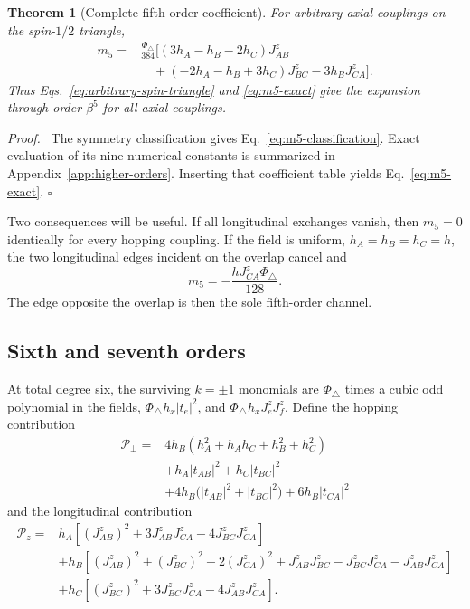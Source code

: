 \documentclass[11pt]{article}
\newcommand{\PhiTri}{\Phi_\triangle}
\newtheorem{theorem}{Theorem}
\newenvironment{proof}{\par\noindent\textit{Proof.}\ }%
{\unskip\nobreak\hfill\(\square\)\par}
\begin{document}
\begin{theorem}[Complete fifth-order coefficient]
\label{thm:quintic}
For arbitrary axial couplings on the spin-$1/2$ triangle,
\begin{align}
 m_5={}&\frac{\PhiTri}{384}\bigl[
 (3h_A-h_B-2h_C)J_{AB}^z\nonumber\\
 &\quad+(-2h_A-h_B+3h_C)J_{BC}^z
 -3h_BJ_{CA}^z\bigr].
 \label{eq:m5-exact}
\end{align}
Thus Eqs.~\eqref{eq:arbitrary-spin-triangle} and \eqref{eq:m5-exact} give the expansion
through order $\beta^5$ for all axial couplings.
\end{theorem}

\begin{proof}
The symmetry classification gives Eq.~\eqref{eq:m5-classification}.  Exact
evaluation of its nine numerical constants is summarized in
Appendix~\ref{app:higher-orders}.  Inserting that coefficient table yields
Eq.~\eqref{eq:m5-exact}.
\end{proof}

Two consequences will be useful.  If all longitudinal exchanges vanish,
then $m_5=0$ identically for every hopping coupling.  If the field is
uniform, $h_A=h_B=h_C=h$, the two longitudinal edges incident on the overlap
cancel and
\begin{equation}
 m_5=-\frac{hJ_{CA}^z\PhiTri}{128}.
 \label{eq:m5-uniform}
\end{equation}
The edge opposite the overlap is then the sole fifth-order channel.

\subsection{Sixth and seventh orders}

At total degree six, the surviving $k=\pm1$ monomials are $\PhiTri$ times a
cubic odd polynomial in the fields, $\PhiTri h_x|t_e|^2$, and
$\PhiTri h_xJ_e^zJ_f^z$.  Define the hopping contribution
\begin{align}
 \mathcal P_\perp={}&
 4h_B(h_A^2+h_Ah_C+h_B^2+h_C^2)\nonumber\\
 &+h_A|t_{AB}|^2+h_C|t_{BC}|^2\nonumber\\
 &+4h_B\bigl(|t_{AB}|^2+|t_{BC}|^2\bigr)
 +6h_B|t_{CA}|^2
 \label{eq:Pperp}
\end{align}
and the longitudinal contribution
\begin{align}
 \mathcal P_z={}&
 h_A\left[(J_{AB}^z)^2+3J_{AB}^zJ_{CA}^z
              -4J_{BC}^zJ_{CA}^z\right]\nonumber\\
 &+h_B\left[(J_{AB}^z)^2+(J_{BC}^z)^2+2(J_{CA}^z)^2
       +J_{AB}^zJ_{BC}^z-J_{BC}^zJ_{CA}^z-J_{AB}^zJ_{CA}^z\right]\nonumber\\
 &+h_C\left[(J_{BC}^z)^2+3J_{BC}^zJ_{CA}^z
              -4J_{AB}^zJ_{CA}^z\right].
 \label{eq:Pz}
\end{align}
\end{document}
